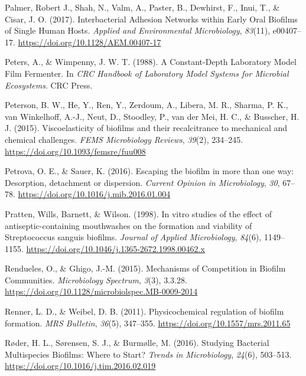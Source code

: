 \documentclass[
  letterpaper,
]{book}
\newlength{\cslhangindent}
\newlength{\cslentryspacingunit} %
\newenvironment{CSLReferences}[2] %
 {%
  \setlength{\parindent}{0pt}
  \ifodd #1
  \let\oldpar\par
  \def\par{\hangindent=\cslhangindent\oldpar}
  \fi
  \setlength{\parskip}{#2\cslentryspacingunit}
 }%
 {}
\begin{document}
\begin{CSLReferences}{1}{0}
\leavevmode{}%
Palmer, Robert J., Shah, N., Valm, A., Paster, B., Dewhirst, F., Inui,
T., \& Cisar, J. O. (2017). Interbacterial {Adhesion Networks} within
{Early Oral Biofilms} of {Single Human Hosts}. \emph{Applied and
Environmental Microbiology}, \emph{83}(11), e00407--17.
\url{https://doi.org/10.1128/AEM.00407-17}

\leavevmode{}%
Peters, A., \& Wimpenny, J. W. T. (1988). A {Constant-Depth Laboratory
Model Film Fermenter}. In \emph{{CRC Handbook} of {Laboratory Model
Systems} for {Microbial Ecosystems}}. {CRC Press}.

\leavevmode{}%
Peterson, B. W., He, Y., Ren, Y., Zerdoum, A., Libera, M. R., Sharma, P.
K., van Winkelhoff, A.-J., Neut, D., Stoodley, P., van der Mei, H. C.,
\& Busscher, H. J. (2015). Viscoelasticity of biofilms and their
recalcitrance to mechanical and chemical challenges. \emph{FEMS
Microbiology Reviews}, \emph{39}(2), 234--245.
\url{https://doi.org/10.1093/femsre/fuu008}

\leavevmode{}%
Petrova, O. E., \& Sauer, K. (2016). Escaping the biofilm in more than
one way: Desorption, detachment or dispersion. \emph{Current Opinion in
Microbiology}, \emph{30}, 67--78.
\url{https://doi.org/10.1016/j.mib.2016.01.004}

\leavevmode{}%
Pratten, Wills, Barnett, \& Wilson. (1998). In vitro studies of the
effect of antiseptic-containing mouthwashes on the formation and
viability of {Streptococcus} sanguis biofilms. \emph{Journal of Applied
Microbiology}, \emph{84}(6), 1149--1155.
\url{https://doi.org/10.1046/j.1365-2672.1998.00462.x}

\leavevmode{}%
Rendueles, O., \& Ghigo, J.-M. (2015). Mechanisms of {Competition} in
{Biofilm Communities}. \emph{Microbiology Spectrum}, \emph{3}(3),
3.3.28. \url{https://doi.org/10.1128/microbiolspec.MB-0009-2014}

\leavevmode{}%
Renner, L. D., \& Weibel, D. B. (2011). Physicochemical regulation of
biofilm formation. \emph{MRS Bulletin}, \emph{36}(5), 347--355.
\url{https://doi.org/10.1557/mrs.2011.65}

\leavevmode{}%
Røder, H. L., Sørensen, S. J., \& Burmølle, M. (2016). Studying
{Bacterial Multispecies Biofilms}: {Where} to {Start}? \emph{Trends in
Microbiology}, \emph{24}(6), 503--513.
\url{https://doi.org/10.1016/j.tim.2016.02.019}


\end{CSLReferences}
\end{document}
